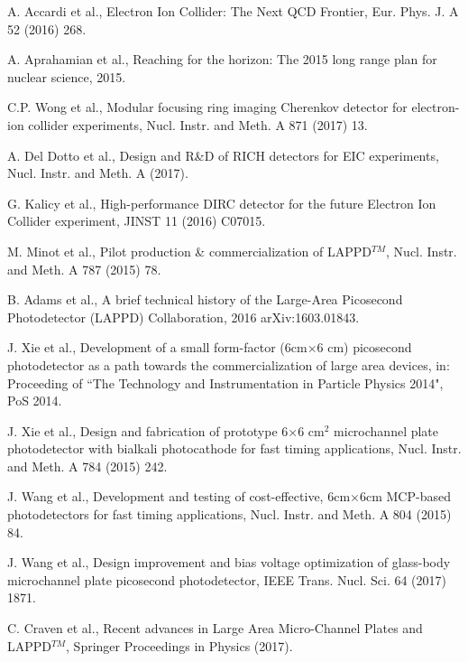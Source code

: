 \documentclass[preprint,5p]{elsarticle}
\begin{document}
  

\begin{thebibliography}{99}

A. Accardi et al., Electron Ion Collider: The Next QCD Frontier, Eur. Phys. J.  
A 52 (2016) 268.

A. Aprahamian et al., Reaching for the horizon: The 2015 long range plan for 
nuclear science, 2015. 

C.P. Wong et al., Modular focusing ring imaging Cherenkov detector for 
electron-ion collider experiments, Nucl. Instr. and Meth. A 871 (2017) 13.

A. Del Dotto et al., Design and R{\&}D of RICH detectors for EIC experiments, 
   Nucl. Instr. and Meth. A (2017).

G. Kalicy et al., High-performance DIRC detector for the future Electron Ion 
Collider experiment, JINST 11 (2016) C07015.

   M. Minot et al., Pilot production {\&} commercialization of LAPPD$^{TM}$, 
   Nucl.  Instr.  and Meth. A 787 (2015) 78.

B. Adams et al., A brief technical history of the Large-Area Picosecond 
Photodetector (LAPPD) Collaboration, 2016 arXiv:1603.01843.

J. Xie et al., Development of a small form-factor (6cm$\times$6 cm) picosecond 
photodetector as a path towards the commercialization of large area devices, 
in: Proceeding of ``The Technology and Instrumentation in Particle Physics 
2014", PoS 2014.

J. Xie et al., Design and fabrication of prototype 6$\times$6 cm$^2$ 
microchannel plate photodetector with bialkali photocathode for fast timing 
applications, Nucl. Instr. and Meth. A 784 (2015) 242.

J. Wang et al., Development and testing of cost-effective, 6cm$\times$6cm 
MCP-based photodetectors for fast timing applications, Nucl. Instr. and Meth.  
A 804 (2015) 84.

J. Wang et al., Design improvement and bias voltage optimization of glass-body 
microchannel plate picosecond photodetector, IEEE Trans. Nucl. Sci. 64 (2017) 
1871.

C. Craven et al., Recent advances in Large Area Micro-Channel Plates and 
LAPPD$^{TM}$, Springer Proceedings in Physics (2017).


\end{thebibliography}
\end{document}
